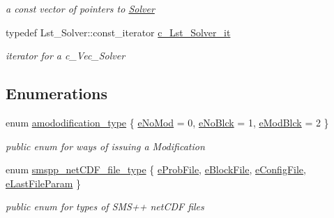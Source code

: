 \begin{Indent}
\begin{DoxyCompactItemize}
\begin{DoxyCompactList}\small\item\em a const vector of pointers to \mbox{\hyperlink{class_s_m_spp__di__unipi__it_1_1_solver}{Solver}} \end{DoxyCompactList}\item 
\mbox{\label{namespace_s_m_spp__di__unipi__it_a8d60e91b37db595a92964f6f4a52bf17}} 
typedef Lst\+\_\+\+Solver\+::const\+\_\+iterator \mbox{\hyperlink{namespace_s_m_spp__di__unipi__it_a8d60e91b37db595a92964f6f4a52bf17}{c\+\_\+\+Lst\+\_\+\+Solver\+\_\+it}}
\begin{DoxyCompactList}\small\item\em iterator for a c\+\_\+\+Vec\+\_\+\+Solver \end{DoxyCompactList}\end{DoxyCompactItemize}
\end{Indent}
\subsection*{Enumerations}
\begin{DoxyCompactItemize}
\item 
enum \mbox{\hyperlink{group___modification___t_y_p_e_s_ga48fddcdd03a03f49b7e389ca1ed938d4}{amododification\+\_\+type}} \{ \mbox{\hyperlink{group___modification___t_y_p_e_s_gga48fddcdd03a03f49b7e389ca1ed938d4a57f092e099708d34d61bb2cf66f074b3}{e\+No\+Mod}} = 0, 
\mbox{\hyperlink{group___modification___t_y_p_e_s_gga48fddcdd03a03f49b7e389ca1ed938d4ada69e89c5f46e563d8a13cfa6830c136}{e\+No\+Blck}} = 1, 
\mbox{\hyperlink{group___modification___t_y_p_e_s_gga48fddcdd03a03f49b7e389ca1ed938d4a21b14b26b1c0093a0905f6fc010bad29}{e\+Mod\+Blck}} = 2
 \}
\begin{DoxyCompactList}\small\item\em public enum for ways of issuing a Modification \end{DoxyCompactList}\item 
enum \mbox{\hyperlink{group___s_m_s__types_gab8fe98d4e6a9961e16ab25006d6eebd8}{smspp\+\_\+net\+C\+D\+F\+\_\+file\+\_\+type}} \{ \mbox{\hyperlink{group___s_m_s__types_ggab8fe98d4e6a9961e16ab25006d6eebd8ab4763484df9e463c82bde775db014c10}{e\+Prob\+File}}, 
\mbox{\hyperlink{group___s_m_s__types_ggab8fe98d4e6a9961e16ab25006d6eebd8a02eebfacbaf656d7b12fdbb866b1b5a1}{e\+Block\+File}}, 
\mbox{\hyperlink{group___s_m_s__types_ggab8fe98d4e6a9961e16ab25006d6eebd8ac08898a33aa19aa77ff3795f37b917bb}{e\+Config\+File}}, 
\mbox{\hyperlink{group___s_m_s__types_ggab8fe98d4e6a9961e16ab25006d6eebd8a80428702d25dc6218902e0cdb084af56}{e\+Last\+File\+Param}}
 \}
\begin{DoxyCompactList}\small\item\em public enum for types of S\+M\+S++ net\+C\+DF files \end{DoxyCompactList}\end{DoxyCompactItemize}
